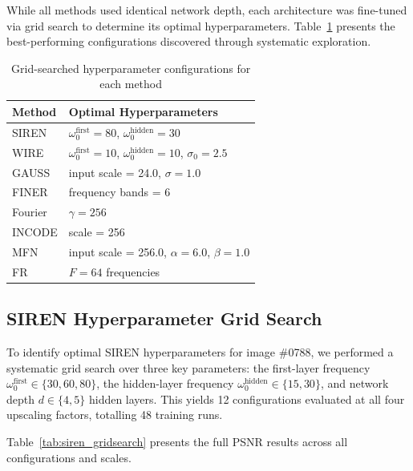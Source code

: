 \documentclass[a4paper,oneside,10pt,ngerman,english]{scrartcl}
\begin{document}
While all methods used identical network depth, each architecture was fine-tuned via grid search to determine its optimal hyperparameters. Table~\ref{tab:hyperparams} presents the best-performing configurations discovered through systematic exploration.

\begin{table}[h]
\centering
\caption{Grid-searched hyperparameter configurations for each method}
\label{tab:hyperparams}
\begin{tabular}{ll}
\toprule
\textbf{Method} & \textbf{Optimal Hyperparameters} \\
\midrule
SIREN & $\omega_0^{\text{first}} = 80$, $\omega_0^{\text{hidden}} = 30$ \\
WIRE & $\omega_0^{\text{first}} = 10$, $\omega_0^{\text{hidden}} = 10$, $\sigma_0 = 2.5$ \\
GAUSS & input scale = 24.0, $\sigma = 1.0$ \\
FINER & frequency bands = 6 \\
Fourier & $\gamma = 256$ \\
INCODE & scale = 256 \\
MFN & input scale = 256.0, $\alpha = 6.0$, $\beta = 1.0$ \\
FR & $F = 64$ frequencies \\
\bottomrule
\end{tabular}
\end{table}

\subsection{SIREN Hyperparameter Grid Search}
\label{subsec:gridsearch}

To identify optimal SIREN hyperparameters for image \#0788, we performed a systematic grid search over three key parameters: the first-layer frequency $\omega_0^{\text{first}} \in \{30, 60, 80\}$, the hidden-layer frequency $\omega_0^{\text{hidden}} \in \{15, 30\}$, and network depth $d \in \{4, 5\}$ hidden layers. This yields 12 configurations evaluated at all four upscaling factors, totalling 48 training runs.

Table~\ref{tab:siren_gridsearch} presents the full PSNR results across all configurations and scales.
\end{document}
